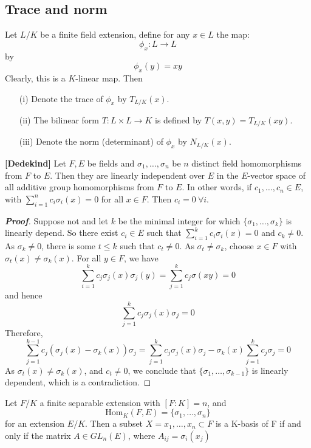 \subsection{Trace and norm}
\begin{definition}
Let $L/K$ be a finite field extension, define for any $x \in L$ the map:
$$\phi_x: L \rightarrow L$$ by
$$\phi_x(y)=xy$$
Clearly, this is a $K$-linear map. Then
\begin{enumerate}
\item[(i)] Denote the trace of $\phi_x$ by $T_{L/K}(x)$.
\item[(ii)] The bilinear form $T: L \times L \rightarrow K$ is defined by $T(x,y)=T_{L/K}(xy)$.
\item[(iii)] Denote the norm (determinant) of $\phi_x$ by $N_{L/K}(x)$.
\end{enumerate}
\end{definition}
\begin{theorem}{\bf [Dedekind]}\label{D; Dedekind hom} Let $F,E$ be fields and $\sigma_1,\ldots,\sigma_n$ be $n$ distinct field homomorphisms from $F$ to $E$. Then they are linearly independent over $E$ in the $E$-vector
space of all additive group homomorphisms from $F$ to $E$. In other words,
if $c_1,\ldots,c_n \in E$, with $\sum_{i=1}^n c_i \sigma_i(x)=0$ for all $x \in F$. Then $c_i=0 ~\forall i$.
\end{theorem}
\begin{proof}[\bf Proof] Suppose not and let $k$ be the minimal integer for which $\{\sigma_1,\ldots,\sigma_k\}$ is linearly depend. So there exist $c_i \in E$ such that $\sum_{i=1}^k c_i \sigma_i(x)=0$ and $c_k \neq 0$. As $\sigma_k \neq 0$, there is some $t \le k$ such that $c_t \neq 0$. As $\sigma_t \neq \sigma_k$, choose $x \in F$ with $\sigma_t(x) \neq \sigma_k(x)$. For all $y \in F$, we have
$$\sum_{i=1}^kc_j \sigma_j(x)\sigma_j(y)=\sum_{j=1}^k c_j \sigma(xy)=0$$
and hence
$$\sum_{j=1}^k c_j\sigma_j(x)\sigma_j=0$$ Therefore,
$$\sum_{j=1}^{k-1} c_j (\sigma_j(x)-\sigma_k(x))\sigma_j=\sum_{j=1}^k c_j \sigma_j(x)\sigma_j-\sigma_k(x)\sum_{j=1}^k c_j\sigma_j=0$$
As $\sigma_t(x) \neq \sigma_k(x)$, and $c_t \neq 0$, we conclude that $\{\sigma_1,\ldots,\sigma_{k-1}\}$ is
linearly dependent, which is a contradiction.
\end{proof}
\begin{lemma} Let $F/K$ a finite separable extension with $[F : K] = n$, and
$$\text{Hom}_K(F,E) =\{\sigma_1,\ldots , \sigma_n\}$$ for an extension $E/K$.
Then a subset $X = {x_1, \ldots , x_n} \subset F$ is a K-basis
of F if and only if the matrix $A \in GL_n(E)$, where $A_{ij}=\sigma_i(x_j)$
\end{lemma}
